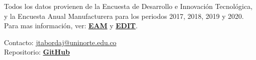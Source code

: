 \documentclass[12pt,a4paper]{article}
\begin{document}
Todos los datos provienen de la Encuesta de Desarrollo e Innovación Tecnológica, y la Encuesta Anual Manufacturera para los periodos 2017, 2018, 2019 y 2020. Para mas información, ver: \textbf{\href{https://www.dane.gov.co/index.php/estadisticas-por-tema/industria/encuesta-anual-manufacturera-enam}{EAM}} y  \textbf{\href{https://www.dane.gov.co/index.php/estadisticas-por-tema/tecnologia-e-innovacion/encuesta-de-desarrollo-e-innovacion-tecnologica-edit}{EDIT}}.

\vfill

\noindent Contacto: \href{mailto:jtabordaj@uninorte.edu.co}{jtabordaj@uninorte.edu.co} \\
Repositorio: \textbf{\href{https://github.com/jtabordaj/research_perilla}{GitHub}}
\end{document}
